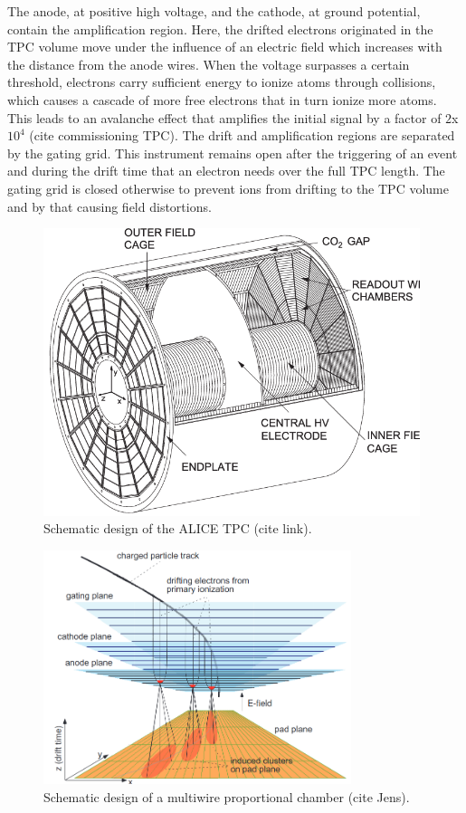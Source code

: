 \documentclass[12pt,a4paper]{report}
\begin{document}
The anode, at positive high voltage, and the cathode, at ground potential, contain the amplification region. Here, the drifted electrons originated in the TPC volume move under the influence of an electric field which increases with the distance from the anode wires. When the voltage surpasses a certain threshold, electrons carry sufficient energy to ionize atoms through collisions, which causes a cascade of more free electrons that in turn ionize more atoms. This leads to an avalanche effect that amplifies the initial signal by a factor of $2$x$10^4$ (cite commissioning TPC). The drift and amplification regions are separated by the gating grid. This instrument remains open after the triggering of an event and during the drift time that an electron needs over the full TPC length. The gating grid is closed otherwise to prevent ions from drifting to the TPC volume and by that causing field distortions.
\begin{figure}[tb!]
\centering
\includegraphics[width=11cm]{Plots/ALICETPC.png}  
\caption{Schematic design of the ALICE TPC (cite link).}
\label{ALICETPC}
\end{figure}
\begin{figure}[tb!]
\centering
\includegraphics[width=9cm]{Plots/MWPC.png}  
\caption{Schematic design of a multiwire proportional chamber (cite Jens).}
\label{MWPC}
\end{figure}
\end{document}
